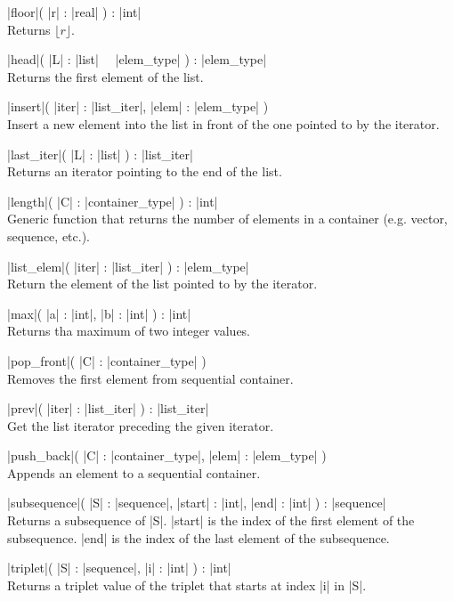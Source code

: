 \documentclass{article}
\newcommand{\OF}{\ \keyword{of}\ }
\begin{document}
\FUNCT |floor|( |r| : |real| ) : |int| \ENDFUNCT \\
Returns $\lfloor r \rfloor$.

\FUNCT |head|( |L| : |list| \OF |elem_type| ) : |elem_type| \ENDFUNCT \\
Returns the first element of the list.

\PROC |insert|( |iter| : |list_iter|, |elem| : |elem_type| ) \ENDPROC \\
Insert a new element into the list in front of the one pointed to by the iterator.

\FUNCT |last_iter|( |L| : |list| ) : |list_iter| \ENDFUNCT \\
Returns an iterator pointing to the end of the list.

\FUNCT |length|( |C| : |container_type| ) : |int| \ENDFUNCT\\
Generic function that returns the number of elements in a container
(e.g. vector, sequence, etc.).

\FUNCT |list_elem|( |iter| : |list_iter| ) : |elem_type| \ENDFUNCT \\
Return the element of the list pointed to by the iterator.

\FUNCT |max|( |a| : |int|, |b| : |int| ) : |int| \ENDFUNCT \\
Returns tha maximum of two integer values.

\PROC |pop_front|( |C| : |container_type| ) \ENDPROC \\
Removes the first element from sequential container.

\FUNCT |prev|( |iter| : |list_iter| ) : |list_iter| \ENDFUNCT \\
Get the list iterator preceding the given iterator.

\PROC |push_back|( |C| : |container_type|, |elem| : |elem_type| ) \ENDPROC \\
Appends an element to a sequential container.

\FUNCT |subsequence|( |S| : |sequence|, |start| : |int|, |end| : |int| ) : |sequence| \ENDFUNCT\\
Returns a subsequence of |S|. |start| is the index of the first element of
the subsequence. |end| is the index of the last element of the subsequence.

\FUNCT |triplet|( |S| : |sequence|, |i| : |int| ) : |int|\ENDFUNCT\\
Returns a triplet value of the triplet that starts at index |i| in |S|.
\end{document}
